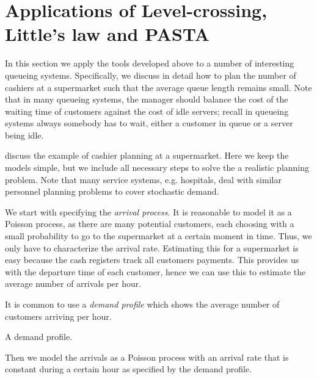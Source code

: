 \documentclass[stochastic-or.tex]{subfiles}
\begin{document}
\section{Applications of Level-crossing, Little's law and PASTA}
\label{sec:mnmn1}

In this section we apply the tools developed above to a number of interesting queueing systems.
Specifically, we discuss in detail how to plan the number of cashiers at a supermarket such that the average queue length remains small.
Note that in many queueing systems, the manager should balance the cost of the waiting time of customers against the cost of idle servers; recall in queueing systems always somebody has to wait, either a customer in queue or a server being idle.





 discuss the example of cashier planning at a supermarket.
Here we keep the models simple, but we include all necessary steps to solve the a realistic planning problem.
Note that many service systems, e.g.
hospitals, deal with similar personnel planning problems to cover stochastic demand.


We start with specifying the \emph{arrival process}.
It is reasonable to model it as a Poisson process, as there are many potential customers, each choosing with a small probability to go to the supermarket at a certain moment in time.
Thus, we only have to characterize the arrival rate.
Estimating this for a supermarket is easy because the cash registers track all customers payments.  This provides us with the departure time of each customer, hence we can use this to estimate the average number of arrivals per hour.

It is common to use a \emph{demand profile} which shows the average number of customers arriving per hour.
\begin{marginfigure}
\caption{A demand profile.}
\label{fig:loadprofile}
\end{marginfigure}
Then we model the arrivals as a Poisson process with an arrival rate that is constant during a certain hour as specified by the demand profile.
\end{document}
